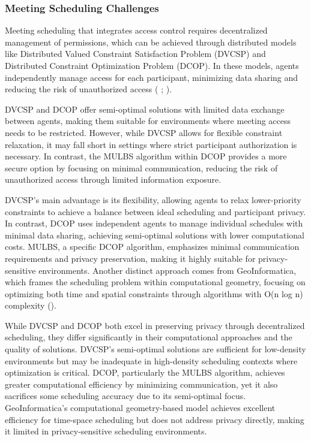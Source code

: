 \begin{spacing}{1.0}
    \subsubsection{Meeting Scheduling Challenges}
    \indent \indent Meeting scheduling that integrates access control requires decentralized management of permissions, which can be achieved through distributed models like Distributed Valued Constraint Satisfaction Problem (DVCSP) and Distributed Constraint Optimization Problem (DCOP). In these models, agents independently manage access for each participant, minimizing data sharing and reducing the risk of unauthorized access ( \cite{takuotsuruta} ;  \cite{enembreck2012}). 
    \par DVCSP and DCOP offer semi-optimal solutions with limited data exchange between agents, making them suitable for environments where meeting access needs to be restricted. However, while DVCSP allows for flexible constraint relaxation, it may fall short in settings where strict participant authorization is necessary. In contrast, the MULBS algorithm within DCOP provides a more secure option by focusing on minimal communication, reducing the risk of unauthorized access through limited information exposure.
    \par DVCSP’s main advantage is its flexibility, allowing agents to relax lower-priority constraints to achieve a balance between ideal scheduling and participant privacy. In contrast, DCOP uses independent agents to manage individual schedules with minimal data sharing, achieving semi-optimal solutions with lower computational costs. MULBS, a specific DCOP algorithm, emphasizes minimal communication requirements and privacy preservation, making it highly suitable for privacy-sensitive environments. Another distinct approach comes from GeoInformatica, which frames the scheduling problem within computational geometry, focusing on optimizing both time and spatial constraints through algorithms with O(n log n) complexity (\cite{florian2009}). 
    \par While DVCSP and DCOP both excel in preserving privacy through decentralized scheduling, they differ significantly in their computational approaches and the quality of solutions. DVCSP’s semi-optimal solutions are sufficient for low-density environments but may be inadequate in high-density scheduling contexts where optimization is critical. DCOP, particularly the MULBS algorithm, achieves greater computational efficiency by minimizing communication, yet it also sacrifices some scheduling accuracy due to its semi-optimal focus. GeoInformatica’s computational geometry-based model achieves excellent efficiency for time-space scheduling but does not address privacy directly, making it limited in privacy-sensitive scheduling environments.

\end{spacing}
